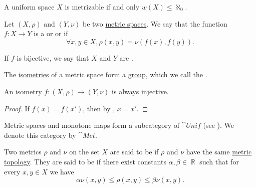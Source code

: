 \begin{theorem}\label{thm:countable_uniform_base_implies_metrizable}
  A uniform space \( X \) is metrizable if and only \( w(X) \leq \aleph_0 \).
\end{theorem}

\medskip

\begin{definition}\label{def:isometry}
  Let \( (X, \rho) \) and \( (Y, \nu) \) be two \hyperref[def:metric_space]{metric spaces}. We say that the function \( f: X \to Y \) is a  or  or  if
  \begin{equation*}
    \forall x, y \in X, \rho(x, y) = \nu(f(x), f(y)).
  \end{equation*}

  If \( f \) is bijective, we say that \( X \) and \( Y \) are .
\end{definition}

\begin{definition}\label{def:isometry_group}\mimprovised
  The \hyperref[def:isometry]{isometries} of a metric space form a \hyperref[def:group]{group}, which we call the .
\end{definition}

\begin{proposition}\label{thm:isometry_is_injective}
  An \hyperref[def:isometry]{isometry} \( f: (X, \rho) \to (Y, \nu) \) is always injective.
\end{proposition}
\begin{proof}
  If \( f(x) = f(x') \), then by , \( x = x' \).
\end{proof}

\begin{definition}\label{def:category_of_metric_spaces}
  Metric spaces and monotone maps form a subcategory of \( \cat{Unif} \) (see ). We denote this category by \( \cat{Met} \).
\end{definition}

\begin{definition}\label{def:equivalent_metrics}
  Two metrics \( \rho \) and \( \nu \) on the set \( X \) are said to be  if \( \rho \) and \( \nu \) have the same \hyperref[def:metric_topology]{metric topology}. They are said to be  if there exist constants \( \alpha, \beta \in \BbbR \) such that for every \( x, y \in X \) we have
  \begin{equation*}
    \alpha \nu(x, y) \leq \rho(x, y) \leq \beta \nu(x, y).
  \end{equation*}
\end{definition}

